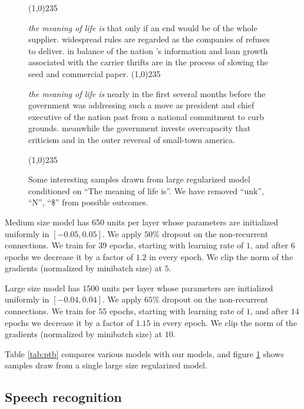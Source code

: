 \documentclass{article}
\begin{document}
\begin{figure}
\line(1,0){235}

  {\footnotesize
  \textit{the meaning of life is} that only if an end would be of the whole supplier. widespread rules are regarded as the companies of refuses to deliver. in balance of the nation 's information and loan growth associated with the carrier thrifts are in the process of slowing the seed and commercial paper.}
\line(1,0){235}

  {\footnotesize
\textit{the meaning of life is} nearly in the first several months before the government was addressing such a move as president and chief executive of the nation past from a national commitment to curb grounds. meanwhile the government invests overcapacity that criticism and in the outer reversal of small-town america.}

\line(1,0){235}
  \caption{Some interesting samples drawn from large regularized model conditioned on ``The meaning of life is''. We have removed ``unk'', ``N'', ``\$'' from possible outcomes.}
  \label{fig:meaning}
\end{figure}



Medium size model has 650 units per layer
whose parameters are initialized uniformly in $[-0.05,
  0.05]$. We apply $50\%$ dropout on the non-recurrent connections. We
train for $39$ epochs, starting with learning rate of $1$, and after
$6$ epochs we decrease it by a factor of $1.2$ in every epoch. We
clip the norm of the gradients
(normalized by minibatch size) at $5$. 


Large size model has 1500 units per layer
whose parameters are initialized uniformly in $[-0.04,
  0.04]$. We apply $65\%$ dropout on the non-recurrent connections. We
train for $55$ epochs, starting with learning rate of $1$, and after
$14$ epochs we decrease it by a factor of $1.15$ in every epoch. We
clip the norm of the gradients
(normalized by minibatch size) at $10$. 


Table \ref{tab:ptb} compares various models with our models, and figure \ref{fig:meaning}
shows samples draw from a single large size regularized model.


\subsection{Speech recognition}
\label{sec:speech}
\end{document}
